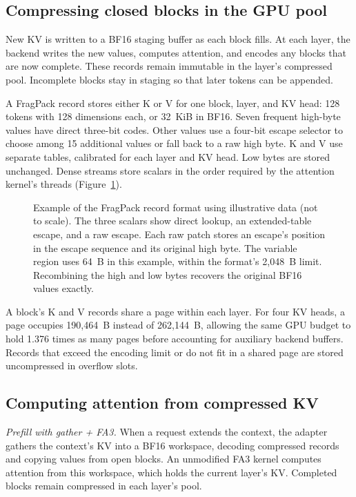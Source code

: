 \documentclass[conference]{IEEEtran}
\begin{document}
\subsection{Compressing closed blocks in the GPU pool}
New KV is written to a BF16 staging buffer as each block fills. At each
layer, the backend writes the new values, computes attention, and encodes
any blocks that are now complete. These records remain immutable in the
layer's compressed pool. Incomplete blocks stay in staging so that later
tokens can be appended.

A FragPack record stores either K or V for one block, layer, and KV head:
128 tokens with 128 dimensions each, or 32~KiB in BF16. Seven frequent
high-byte values have direct three-bit codes. Other values use a four-bit
escape selector to choose among 15 additional values or fall back to a raw
high byte. K and V use separate tables, calibrated for each layer and KV
head. Low bytes are stored unchanged. Dense streams store scalars in the
order required by the attention kernel's threads
(Figure~\ref{fig:record}).

\begin{figure}[t]
\centering

\caption{Example of the FragPack record format using illustrative data
(not to scale). The three scalars show direct lookup, an extended-table
escape, and a raw escape. Each raw patch stores an escape's position in
the escape sequence and its original high byte. The variable region uses
64~B in this example, within the format's 2,048~B limit. Recombining the
high and low bytes recovers the original BF16 values exactly.}
\label{fig:record}
\end{figure}

A block's K and V records share a page within each layer. For four KV heads,
a page occupies 190,464~B instead of 262,144~B, allowing the same GPU budget
to hold 1.376 times as many pages before accounting for auxiliary backend
buffers. Records that exceed the encoding limit or do not fit in a shared
page are stored uncompressed in overflow slots.

\begin{samepage}
\subsection{Computing attention from compressed KV}
\emph{Prefill with gather + FA3.} When a request extends the context, the
adapter gathers the context's KV into a BF16 workspace, decoding compressed
records and copying values from open blocks. An unmodified FA3 kernel
computes attention from this workspace, which holds the current layer's KV.
Completed blocks remain compressed in each layer's pool.

\end{samepage}
\end{document}
